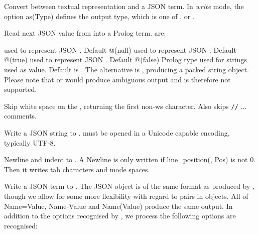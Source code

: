\documentclass[11pt]{article}
\begin{document}
\vspace{0.7cm}

\begin{description}
\nodescription
Convert between textual representation and a JSON term. In
\textit{write} mode, the option as(Type) defines the output type, which
is one of ,  or .

\nodescription
Read next JSON value from  into a Prolog term. 
are:

\begin{description}
 used to represent JSON . Default @(null)
 used to represent JSON . Default @(true)
 used to represent JSON . Default @(false)
Prolog type used for strings used as value. Default
is . The alternative is , producing a
packed string object. Please note that  or
 would produce ambiguous output and is therefore
not supported.
\end{description}

\nodescription
Skip white space on the , returning the first non-ws
character. Also skips \verb$//$ ... comments.

Write a JSON string to .  must be opened in a
Unicode capable encoding, typically UTF-8.

Newline and indent to . A Newline is only written if
line_position(, Pos) is not 0. Then it writes  \Sidiv{}
 tab characters and  mode  spaces.

\nodescription
Write a JSON term to . The JSON object is of the same
format as produced by , though we allow for some more
flexibility with regard to pairs in objects. All of Name=Value,
Name-Value and Name(Value) produce the same output. In addition
to the options recognised by , we process the
following options are recognised:


\end{description}
\end{document}
